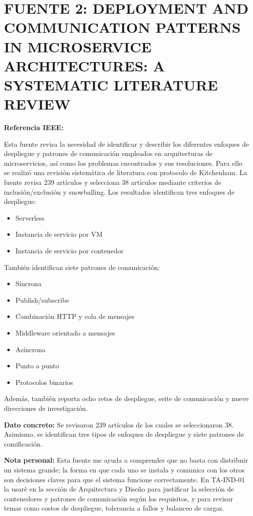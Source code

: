 \documentclass[12pt,a4paper]{article}
\begin{document}
\section*{FUENTE 2: DEPLOYMENT AND COMMUNICATION PATTERNS IN MICROSERVICE ARCHITECTURES: A SYSTEMATIC LITERATURE REVIEW}

\textbf{Referencia IEEE:} 

Esta fuente revisa la necesidad de identificar y describir los diferentes enfoques de despliegue y patrones de comunicación empleados en arquitecturas de microservicios, así como los problemas encontrados y sus resoluciones. Para ello se realizó una revisión sistemática de literatura con protocolo de Kitchenham. La fuente revisa 239 artículos y selecciona 38 artículos mediante criterios de inclusión/exclusión y snowballing. Los resultados identifican tres enfoques de despliegue:

\begin{itemize}
    \item Serverless
    \item Instancia de servicio por VM
    \item Instancia de servicio por contenedor
\end{itemize}

También identifican siete patrones de comunicación:

\begin{itemize}
    \item Síncrona
    \item Publish/subscribe
    \item Combinación HTTP y cola de mensajes
    \item Middleware orientado a mensajes
    \item Asíncrona
    \item Punto a punto
    \item Protocolos binarios
\end{itemize}

Además, también reporta ocho retos de despliegue, seite de comunicación y nueve direcciones de investigación.

\textbf{Dato concreto:} Se revisaron 239 artículos de los cuales se seleccionaron 38. Asimismo, se identifican tres tipos de enfoques de despliegue y siete patrones de comificación.

\textbf{Nota personal:} Esta fuente me ayuda a comprender que no basta con distribuir un sistema grande; la forma en que cada uno se instala y comunica con los otros son decisiones claves para que el sistema funcione correctamente. En TA-IND-01 la usaré en la sección de Arquitectura y Diseño para justificar la selección de contenedores y patrones de comunicación según los requisitos, y para revisar temas como costos de despliegue, tolerancia a fallos y balanceo de cargas.
\end{document}
